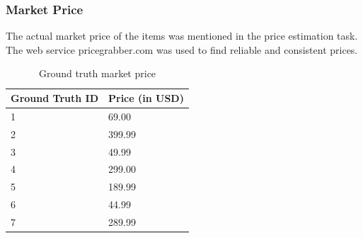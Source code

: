 \subsubsection{Market Price}
The actual market price of the items was mentioned in the price estimation task. The web service pricegrabber.com was used to find reliable and consistent prices. 
\begin{table}[h!]
	\begin{center}
	\begin{tabular}{| p{6.5cm} | p{6.5cm} |}
		\hline
		Ground Truth ID & Price (in USD) \\
		\hline
		1 & 69.00 \\
		\hline
		2 & 399.99 \\
		\hline
		3 & 49.99 \\
		\hline
		4 & 299.00 \\
		\hline
		5 & 189.99 \\
		\hline
		6 & 44.99 \\
		\hline
		7 & 289.99 \\
		\hline
	\end{tabular}
	\end{center}
	\caption{Ground truth market price}
\end{table}
